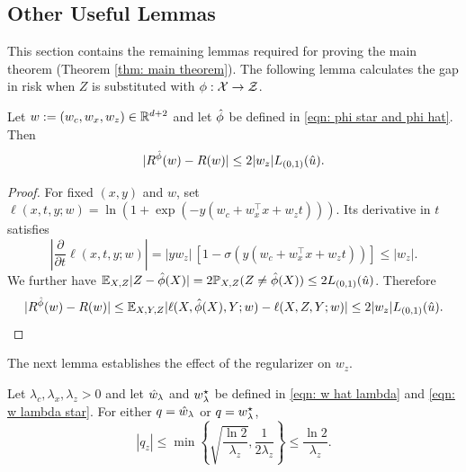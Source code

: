 \subsection{Other Useful Lemmas}

This section contains the remaining lemmas required for proving the main theorem (Theorem \ref{thm: main theorem}).
The following lemma calculates the gap in risk when $Z$ is substituted with $\phi: \mathcal{X} \rightarrow \mathcal{Z}$.

\begin{lem}\label{lem: gap in risk when z is replaced with phi hat}
    Let $w := (w_c,w_x,w_z) \in \mathbb{R}^{d+2}$ and let $\hat{\phi}$ be defined in  \eqref{eqn: phi star and phi hat}. Then
    \begin{equation*}
        |R^{\hat{\phi}}(w) - R(w)| \leq 2|w_z|L_{(0,1)}(\hat{u}).
    \end{equation*}
\end{lem}

\begin{proof}
For fixed $(x,y)$ and $w$, set
$\ell(x,t,y;w)=\ln(1+\exp(-y(w_c+w_x^\top x+w_zt)))$.
Its derivative in $t$ satisfies
\[
\left|\frac{\partial}{\partial t}\ell(x,t,y;w)\right|
=|yw_z|\,[1-\sigma(y(w_c+w_x^\top x+w_zt))]\leq|w_z|.
\]
We further have $\mathbb E_{X,Z}|Z-\hat{\phi}(X)|
=2\mathbb P_{X,Z}(Z\neq\hat{\phi}(X))
\leq2L_{(0,1)}(\hat{u})$.
Therefore
\[
|R^{\hat{\phi}}(w)-R(w)|
\leq\mathbb E_{X,Y,Z}
  |\ell(X,\hat{\phi}(X),Y;w)-\ell(X,Z,Y;w)|
\leq2|w_z|L_{(0,1)}(\hat{u}).
\]
\end{proof}

The next lemma establishes the effect of the regularizer on $w_z$.

\begin{lem}\label{lem: bound weights in terms of lambda}
Let $\lambda_c,\lambda_x,\lambda_z>0$ and let $\hat{w}_\lambda$ and $w^\star_{\lambda}$
be defined in \eqref{eqn: w hat lambda} and \eqref{eqn: w lambda star}.
For either $q=\hat{w}_\lambda$ or $q=w^\star_{\lambda}$,
\[
|q_z|\leq
\min\left\{\sqrt{\frac{\ln2}{\lambda_z}},\frac1{2\lambda_z}\right\}
\leq\frac{\ln2}{\lambda_z}.
\]
\end{lem}

